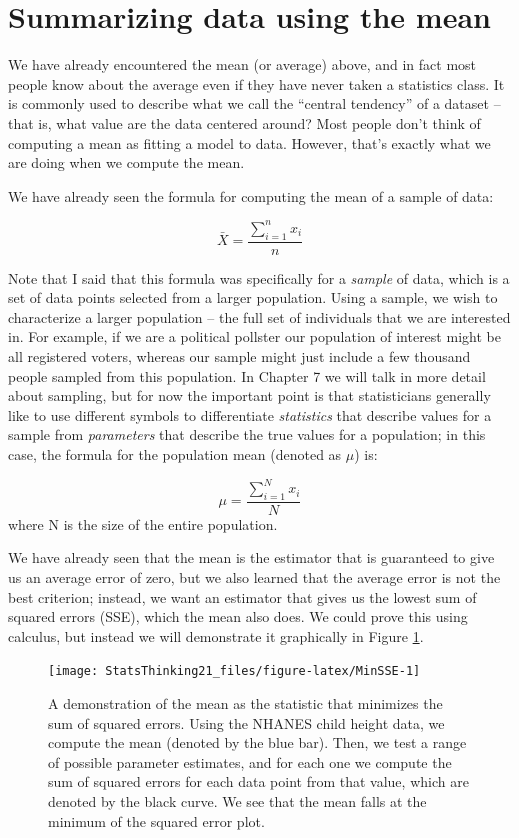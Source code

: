 \documentclass[
  12pt,
]{book}
\begin{document}
\hypertarget{summarizing-data-using-the-mean}{%
\section{Summarizing data using the mean}\label{summarizing-data-using-the-mean}}

We have already encountered the mean (or average) above, and in fact most people know about the average even if they have never taken a statistics class. It is commonly used to describe what we call the ``central tendency'' of a dataset -- that is, what value are the data centered around? Most people don't think of computing a mean as fitting a model to data. However, that's exactly what we are doing when we compute the mean.

We have already seen the formula for computing the mean of a sample of data:

\[
\bar{X} = \frac{\sum_{i=1}^{n}x_i}{n}
\]

Note that I said that this formula was specifically for a \emph{sample} of data, which is a set of data points selected from a larger population. Using a sample, we wish to characterize a larger population -- the full set of individuals that we are interested in. For example, if we are a political pollster our population of interest might be all registered voters, whereas our sample might just include a few thousand people sampled from this population. In Chapter 7 we will talk in more detail about sampling, but for now the important point is that statisticians generally like to use different symbols to differentiate \emph{statistics} that describe values for a sample from \emph{parameters} that describe the true values for a population; in this case, the formula for the population mean (denoted as \(\mu\)) is:

\[
\mu = \frac{\sum_{i=1}^{N}x_i}{N}
\]
where N is the size of the entire population.

We have already seen that the mean is the estimator that is guaranteed to give us an average error of zero, but we also learned that the average error is not the best criterion; instead, we want an estimator that gives us the lowest sum of squared errors (SSE), which the mean also does. We could prove this using calculus, but instead we will demonstrate it graphically in Figure \ref{fig:MinSSE}.

\begin{figure}
\texttt{[image: StatsThinking21\_files/figure-latex/MinSSE-1]} \caption{A demonstration of the mean as the statistic that minimizes the sum of squared errors.  Using the NHANES child height data, we compute the mean (denoted by the blue bar). Then, we test a range of possible parameter estimates, and for each one we compute the sum of squared errors for each data point from that value, which are denoted by the black curve.  We see that the mean falls at the minimum of the squared error plot.}\label{fig:MinSSE}
\end{figure}
\end{document}
